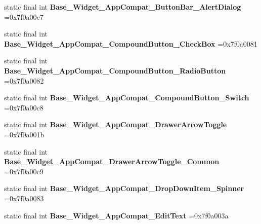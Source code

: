 \begin{DoxyCompactItemize}
\mbox{\label{classproject4_1_1xaria_1_1R_1_1style_a9c22d56f96aa377c966891a18a9cd57a}} 
static final int {\bfseries Base\+\_\+\+Widget\+\_\+\+App\+Compat\+\_\+\+Button\+Bar\+\_\+\+Alert\+Dialog} =0x7f0a00c7
\item 
\mbox{\label{classproject4_1_1xaria_1_1R_1_1style_a0627d1576a62a390fe763f1f5526317d}} 
static final int {\bfseries Base\+\_\+\+Widget\+\_\+\+App\+Compat\+\_\+\+Compound\+Button\+\_\+\+Check\+Box} =0x7f0a0081
\item 
\mbox{\label{classproject4_1_1xaria_1_1R_1_1style_a092c1b84407a12c8dc48bab1e0200f1d}} 
static final int {\bfseries Base\+\_\+\+Widget\+\_\+\+App\+Compat\+\_\+\+Compound\+Button\+\_\+\+Radio\+Button} =0x7f0a0082
\item 
\mbox{\label{classproject4_1_1xaria_1_1R_1_1style_a6943984d322fb0e07561b48f721f4aba}} 
static final int {\bfseries Base\+\_\+\+Widget\+\_\+\+App\+Compat\+\_\+\+Compound\+Button\+\_\+\+Switch} =0x7f0a00c8
\item 
\mbox{\label{classproject4_1_1xaria_1_1R_1_1style_ae94a505e835623feece4abea17fe574e}} 
static final int {\bfseries Base\+\_\+\+Widget\+\_\+\+App\+Compat\+\_\+\+Drawer\+Arrow\+Toggle} =0x7f0a001b
\item 
\mbox{\label{classproject4_1_1xaria_1_1R_1_1style_a4ec643d77bc79c995f3fa184d72a73ea}} 
static final int {\bfseries Base\+\_\+\+Widget\+\_\+\+App\+Compat\+\_\+\+Drawer\+Arrow\+Toggle\+\_\+\+Common} =0x7f0a00c9
\item 
\mbox{\label{classproject4_1_1xaria_1_1R_1_1style_a5e3c66ac81e3acb4a32e2f4898885228}} 
static final int {\bfseries Base\+\_\+\+Widget\+\_\+\+App\+Compat\+\_\+\+Drop\+Down\+Item\+\_\+\+Spinner} =0x7f0a0083
\item 
\mbox{\label{classproject4_1_1xaria_1_1R_1_1style_a358cf3d2d95e0e5749974e50430bce9d}} 
static final int {\bfseries Base\+\_\+\+Widget\+\_\+\+App\+Compat\+\_\+\+Edit\+Text} =0x7f0a003a

\end{DoxyCompactItemize}
